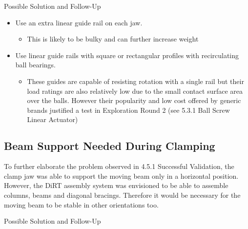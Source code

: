 Possible Solution and Follow-Up
\begin{itemize}
    \item Use an extra linear guide rail on each jaw.
    \begin{itemize}
        \item This is likely to be bulky and can further increase weight
    \end{itemize}
    \item Use linear guide rails with square or rectangular profiles with recirculating ball bearings.
    \begin{itemize}
        \item These guides are capable of resisting rotation with a single rail but their load ratings are also relatively low due to the small contact surface area over the balls. However their popularity and low cost offered by generic brands justified a test in Exploration Round 2 (see 5.3.1 Ball Screw Linear Actuator)
    \end{itemize}
\end{itemize}
        
\subsection{Beam Support Needed During Clamping}
To further elaborate the problem observed in 4.5.1 Successful Validation, the clamp jaw was able to support the moving beam only in a horizontal position. However, the DiRT assembly system was envisioned to be able to assemble columns, beams and diagonal bracings. Therefore it would be necessary for the moving beam to be stable in other orientations too.

Possible Solution and Follow-Up


